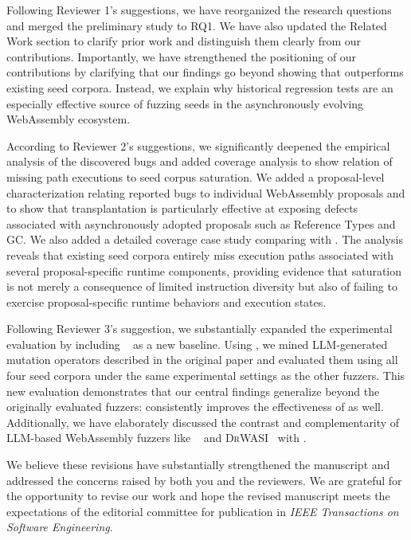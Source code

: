 \documentclass[11pt]{article}
\begin{document}
Following Reviewer 1's suggestions, we have reorganized the research questions and merged the preliminary study to RQ1. We have also updated the Related Work section to clarify prior work and distinguish them clearly from our contributions. Importantly, we have strengthened the positioning of our contributions by clarifying that our findings go beyond showing that \rtbench{} outperforms existing seed corpora. Instead, we explain why historical regression tests are an especially effective source of fuzzing seeds in the asynchronously evolving WebAssembly ecosystem.

According to Reviewer 2's suggestions, we significantly deepened the empirical analysis of the discovered bugs and added coverage analysis to show relation of missing path executions to seed corpus saturation. We added a proposal-level characterization relating reported bugs to individual WebAssembly proposals and to show that transplantation is particularly effective at exposing defects associated with asynchronously adopted proposals such as Reference Types and GC. We also added a detailed coverage case study comparing \rtbench{} with \wasmbench{}. The analysis reveals that existing seed corpora entirely miss execution paths associated with several proposal-specific runtime components, providing evidence that saturation is not merely a consequence of limited instruction diversity but also of failing to exercise proposal-specific runtime behaviors and execution states.

Following Reviewer 3's suggestion, we substantially expanded the experimental evaluation by including \lwdiff{}~\cite{zhou2025lwdiff} as a new baseline. Using \lwdiff{}, we mined LLM-generated mutation operators described in the original paper and evaluated them using all four seed corpora under the same experimental settings as the other fuzzers. This new evaluation demonstrates that our central findings generalize beyond the originally evaluated fuzzers: \rtbench{} consistently improves the effectiveness of \lwdiff{} as well. Additionally, we have elaborately discussed the contrast and complementarity of LLM-based WebAssembly fuzzers like \lwdiff{}~\cite{zhou2025lwdiff} and \textsc{DrWASI}~\cite{zhang2025drwasi} with \rtbench{}.

We believe these revisions have substantially strengthened the manuscript and addressed the concerns raised by both you and the reviewers. We are grateful for the opportunity to revise our work and hope the revised manuscript meets the expectations of the editorial committee for publication in \emph{IEEE Transactions on Software Engineering}.
\end{document}
